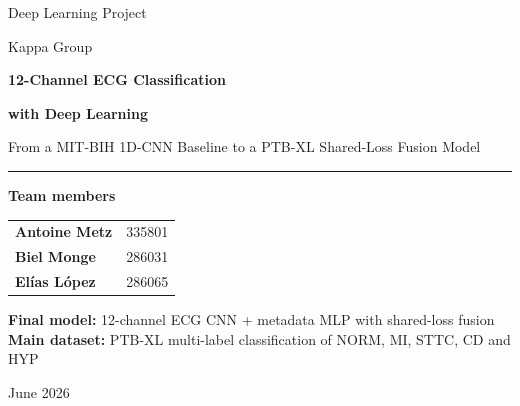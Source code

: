 \documentclass[11pt,a4paper]{article}
\begin{document}

\begin{titlepage}
    \thispagestyle{empty}
    \centering
    \vspace*{0.8cm}
    {\Large Deep Learning Project\par}
    \vspace{0.25cm}
    {\large Kappa Group\par}
    \vspace{1.1cm}
    {\Huge\bfseries\color{darkblue} 12-Channel ECG Classification\par}
    \vspace{0.22cm}
    {\Huge\bfseries\color{darkblue} with Deep Learning\par}
    \vspace{0.55cm}
    {\Large From a MIT-BIH 1D-CNN Baseline to a PTB-XL Shared-Loss Fusion Model\par}
    \vspace{0.95cm}
    \rule{0.82\textwidth}{0.7pt}
    \vspace{0.7cm}

    \begin{minipage}{0.72\textwidth}
    \centering
    {\large\textbf{Team members}}\par
    \vspace{0.25cm}
    \renewcommand{\arraystretch}{1.25}
    \begin{tabular}{>{\bfseries}l c}
        Antoine Metz & 335801 \\
        Biel Monge & 286031 \\
        El\'{i}as L\'{o}pez & 286065 \\
    \end{tabular}
    \end{minipage}

    \vfill
    \begin{minipage}{0.84\textwidth}
    \centering
    \colorbox{softblue}{%
        \begin{minipage}{0.90\textwidth}
        \vspace{0.32cm}
        \centering
        \textbf{Final model:} 12-channel ECG CNN + metadata MLP with shared-loss fusion\\
        \textbf{Main dataset:} PTB-XL multi-label classification of NORM, MI, STTC, CD and HYP
        \vspace{0.32cm}
        \end{minipage}}
    \end{minipage}
    \vspace{0.75cm}

    {\large June 2026\par}
\end{titlepage}
\end{document}
